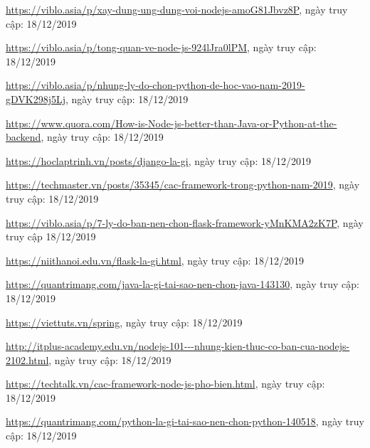 \newpage
\begin{thebibliography}{80}

\bibitem{}
\url{https://viblo.asia/p/xay-dung-ung-dung-voi-nodejs-amoG81Jbvz8P}, ngày truy cập: 18/12/2019

\bibitem{}
\url{https://viblo.asia/p/tong-quan-ve-node-js-924lJra0lPM}, ngày truy cập: 18/12/2019

\bibitem{}
\url{https://viblo.asia/p/nhung-ly-do-chon-python-de-hoc-vao-nam-2019-gDVK298j5Lj}, ngày truy cập: 18/12/2019

\bibitem{}
\url{https://www.quora.com/How-is-Node-js-better-than-Java-or-Python-at-the-backend}, ngày truy cập: 18/12/2019

\bibitem{}
\url{https://hoclaptrinh.vn/posts/django-la-gi}, ngày truy cập: 18/12/2019

\bibitem{}
\url{https://techmaster.vn/posts/35345/cac-framework-trong-python-nam-2019}, ngày truy cập: 18/12/2019

\bibitem{}
\url{https://viblo.asia/p/7-ly-do-ban-nen-chon-flask-framework-yMnKMA2zK7P}, ngày truy cập 18/12/2019

\bibitem{}
\url{https://niithanoi.edu.vn/flask-la-gi.html}, ngày truy cập: 18/12/2019

\bibitem{}
\url{https://quantrimang.com/java-la-gi-tai-sao-nen-chon-java-143130}, ngày truy cập: 18/12/2019

\bibitem{}
\url{https://viettuts.vn/spring}, ngày truy cập: 18/12/2019

\bibitem{}
\url{http://itplus-academy.edu.vn/nodejs-101---nhung-kien-thuc-co-ban-cua-nodejs-2102.html}, ngày truy cập: 18/12/2019

\bibitem{}
\url{https://techtalk.vn/cac-framework-node-js-pho-bien.html}, ngày truy cập: 18/12/2019

\bibitem{}
\url{https://quantrimang.com/python-la-gi-tai-sao-nen-chon-python-140518}, ngày truy cập: 18/12/2019

\end{thebibliography}
